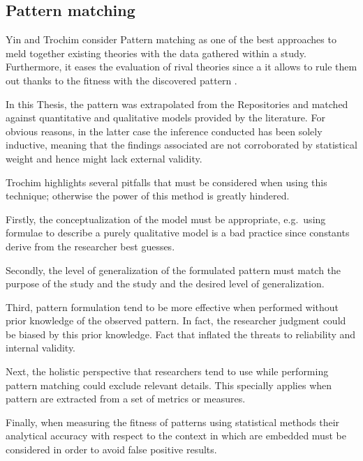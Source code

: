 \subsection{Pattern matching}
Yin \cite{case_study_guide} and Trochim \cite{pattern_matching} consider Pattern matching as one of the best approaches to meld together existing theories with the data gathered within a study. Furthermore, it eases the evaluation of rival theories since a it allows to rule them out thanks to the fitness with the discovered pattern \cite{pattern_matching}.

In this Thesis, the pattern was extrapolated from the Repositories and matched against quantitative and qualitative models provided by the literature. For obvious reasons, in the latter case the inference conducted has been solely inductive, meaning that the findings associated are not corroborated by statistical weight and hence might lack external validity.


Trochim \cite{pattern_matching} highlights several pitfalls that must be considered when using this technique; otherwise the power of this method is greatly hindered. 

Firstly, the conceptualization of the model must be appropriate, e.g.\ using formulae to describe a purely qualitative model is a bad practice since constants derive from the researcher best guesses.

Secondly, the level of generalization of the formulated pattern must match the purpose of the study and the study and the desired level of generalization.

Third, pattern formulation tend to be more effective when performed without prior knowledge of the observed pattern. In fact, the researcher judgment could be biased by this prior knowledge. Fact that inflated the threats to reliability and internal validity.

Next, the holistic perspective that researchers tend to use while performing pattern matching could exclude relevant details. This specially applies when pattern are extracted from a set of metrics or measures.

Finally, when measuring the fitness of patterns using statistical methods their analytical accuracy with respect to the context in which are embedded must be considered in order to avoid false positive results.


